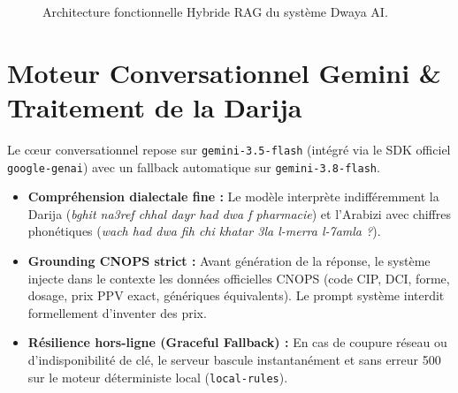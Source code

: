 \documentclass[a4paper,10pt]{article}
\begin{document}
\begin{figure}[h!]
\caption{Architecture fonctionnelle Hybride RAG du système Dwaya AI.}
\end{figure}

\section{Moteur Conversationnel Gemini \& Traitement de la Darija}

Le cœur conversationnel repose sur \texttt{gemini-3.5-flash} (intégré via le SDK officiel \texttt{google-genai}) avec un fallback automatique sur \texttt{gemini-3.8-flash}.

\begin{itemize}[leftmargin=*]
    \item \textbf{Compréhension dialectale fine :} Le modèle interprète indifféremment la Darija (\textit{bghit na3ref chhal dayr had dwa f pharmacie}) et l'Arabizi avec chiffres phonétiques (\textit{wach had dwa fih chi khatar 3la l-merra l-7amla ?}).
    \item \textbf{Grounding CNOPS strict :} Avant génération de la réponse, le système injecte dans le contexte les données officielles CNOPS (code CIP, DCI, forme, dosage, prix PPV exact, génériques équivalents). Le prompt système interdit formellement d'inventer des prix.
    \item \textbf{Résilience hors-ligne (Graceful Fallback) :} En cas de coupure réseau ou d'indisponibilité de clé, le serveur bascule instantanément et sans erreur 500 sur le moteur déterministe local (\texttt{local-rules}).
\end{itemize}
\end{document}
